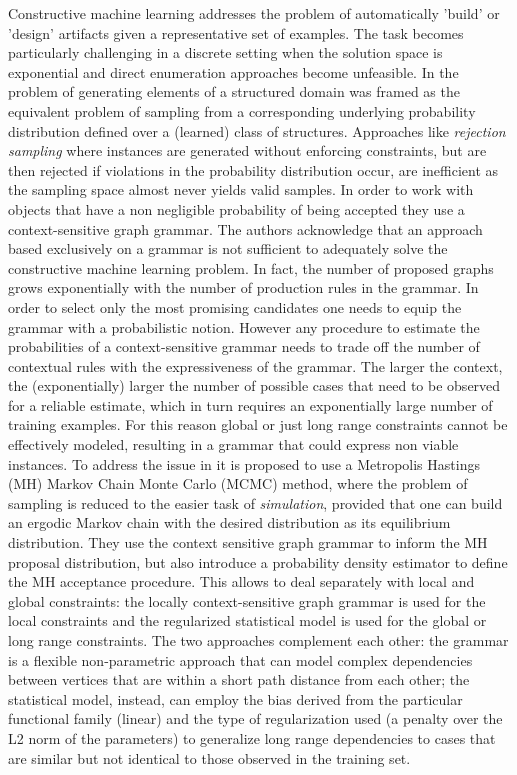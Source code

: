 \documentclass{article}
\begin{document}
Constructive machine learning addresses the problem of automatically 'build'
or 'design' artifacts given a representative set of examples. The task becomes
particularly challenging in a discrete setting when the solution space is
exponential and direct enumeration approaches become unfeasible. In
\cite{costa16} the problem of generating elements of a structured domain was
framed as the equivalent problem of sampling from a corresponding underlying
probability distribution defined over a (learned) class of structures.
Approaches like {\em rejection sampling} where instances are generated without
enforcing constraints, but are then rejected if violations in the probability
distribution occur, are inefficient as the sampling space almost never yields
valid samples. In order to work with objects that have a non negligible
probability of being accepted they use a context-sensitive graph grammar. The
authors acknowledge that an approach based exclusively on a grammar is not
sufficient to adequately solve the constructive machine learning problem. In
fact, the number of proposed graphs grows exponentially with the number of
production rules in the grammar. In order to select only the most promising
candidates one needs to equip the grammar with a probabilistic notion. However
any procedure to estimate the probabilities of a context-sensitive grammar
needs to trade off the number of contextual rules with the expressiveness of
the grammar. The larger the context, the (exponentially) larger the number of
possible cases that need to be observed for a reliable estimate, which in turn
requires an exponentially large number of training examples. For this reason
global or just long range constraints cannot be effectively modeled, resulting
in a grammar that could express non viable instances. To address the issue in
\cite{costa16} it is proposed to use a Metropolis Hastings (MH) Markov Chain
Monte Carlo (MCMC) method, where the problem of sampling is reduced to the
easier task of {\em simulation}, provided that one can build an ergodic Markov
chain with the desired distribution as its equilibrium distribution. They use
the context sensitive graph grammar to inform the MH proposal distribution,
but also introduce a probability density estimator to define the MH acceptance
procedure. This allows to deal separately with local and global constraints:
the locally context-sensitive graph grammar is used for the local constraints
and the regularized statistical model is used for the global or long range
constraints. The two approaches complement each other: the grammar is a
flexible non-parametric approach that can model complex dependencies between
vertices that are within a short path distance from each other; the
statistical model, instead, can employ the bias derived from the particular
functional family (linear) and the type of regularization used (a penalty over
the L2 norm of the parameters) to generalize long range dependencies to cases
that are similar but not identical to those observed in the training set. 
\end{document}
